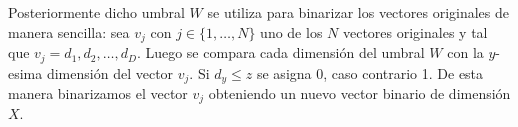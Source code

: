 		Posteriormente dicho umbral $W$ se utiliza para binarizar los vectores originales de manera sencilla: sea $v_j$ con $j \in \{1,\dots,N\}$ uno de los $N$ vectores originales y tal que $v_j = d_1,d_2,\dots,d_D$. Luego se compara cada dimensión del umbral $W$ con la $y$-esima dimensión del vector $v_j$. Si $d_y \leq z$ se asigna 0, caso contrario 1. De esta manera binarizamos el vector $v_j$ obteniendo un nuevo vector binario de dimensión $X$.

		\begin{figure}[htbp]
			\centering
\end{figure}
